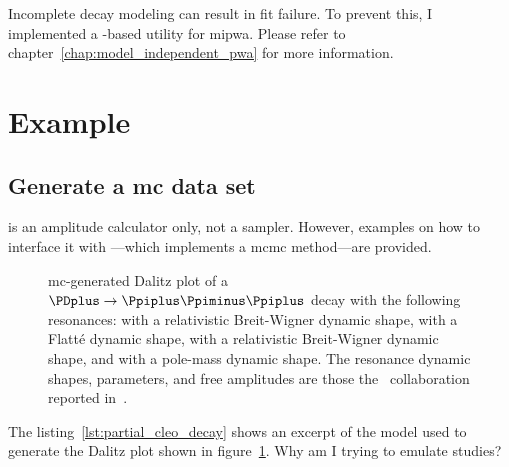         Incomplete decay modeling can result in fit failure.
        To prevent this, I implemented a -based utility for \ac{mipwa}. Please refer to chapter~\ref{chap:model_independent_pwa} for more information.

        \section{Example}
            \subsection{Generate a \ac{mc} data set}

             is an amplitude calculator only, not a sampler.
            However, examples on how to interface it with ---which implements a \ac{mcmc} method---are provided.
                \begin{figure}
                    \centering

                    \caption{\ac{mc}-generated Dalitz plot of a $\PDplus \to \Ppiplus\Ppiminus\Ppiplus$ decay with the following resonances:
                             \Prhozero{} with a relativistic Breit-Wigner dynamic shape,
                             \Pfnez{} with a Flatté dynamic shape,
                             \Pfofzz{} with a relativistic Breit-Wigner dynamic shape, and \Psigma{} with a pole-mass dynamic shape.
                             The resonance dynamic shapes, parameters, and free amplitudes are those the \cleo~collaboration reported in~\cite{PhysRevD.76.012001}.}
                    \label{fig:partial_cleo_decay}
                \end{figure}
            \clearpage
            
            The listing~\ref{lst:partial_cleo_decay} shows an excerpt of the model used to generate the Dalitz plot shown in figure~\ref{fig:partial_cleo_decay}.
            {\color{red} Why am I trying to emulate \cleo{} studies?}

